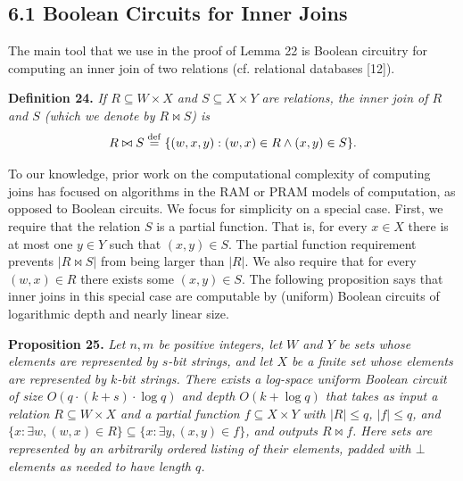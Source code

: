\documentclass[10pt,a4paper]{article}
\newenvironment{originalresult}[1]{\par\medskip\noindent\textbf{#1.}\itshape}{\par\medskip}
\begin{document}
\subsection*{6.1 Boolean Circuits for Inner Joins}
The main tool that we use in the proof of Lemma 22 is Boolean circuitry for computing an inner join of two relations (cf. relational databases [12]).
\begin{originalresult}{Definition 24}
If $R\subseteq W\times X$ and $S\subseteq X\times Y$ are relations, the inner join of $R$ and $S$ (which we denote by $R\bowtie S$) is
\[R\bowtie S\stackrel{\rm def}=\{(w,x,y):(w,x)\in R\land(x,y)\in S\}.\]
\end{originalresult}
To our knowledge, prior work on the computational complexity of computing joins has focused on algorithms in the RAM or PRAM models of computation, as opposed to Boolean circuits.
We focus for simplicity on a special case. First, we require that the relation $S$ is a partial function. That is, for every $x\in X$ there is at most one $y\in Y$ such that $(x,y)\in S$. The partial function requirement prevents $|R\bowtie S|$ from being larger than $|R|$. We also require that for every $(w,x)\in R$ there exists some $(x,y)\in S$.
The following proposition says that inner joins in this special case are computable by (uniform) Boolean circuits of logarithmic depth and nearly linear size.
\begin{originalresult}{Proposition 25}
Let $n,m$ be positive integers, let $W$ and $Y$ be sets whose elements are represented by $s$-bit strings, and let $X$ be a finite set whose elements are represented by $k$-bit strings.
There exists a log-space uniform Boolean circuit of size $O(q\cdot(k+s)\cdot\log q)$ and depth $O(k+\log q)$ that takes as input a relation $R\subseteq W\times X$ and a partial function $f\subseteq X\times Y$ with $|R|\le q$, $|f|\le q$, and $\{x:\exists w,(w,x)\in R\}\subseteq\{x:\exists y,(x,y)\in f\}$, and outputs $R\bowtie f$.
Here sets are represented by an arbitrarily ordered listing of their elements, padded with $\bot$ elements as needed to have length $q$.
\end{originalresult}
\end{document}
